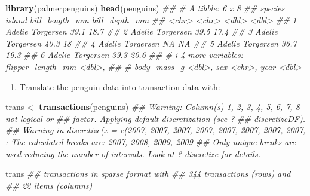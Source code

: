 \documentclass[
  notitlepage]{book}
\newenvironment{Shaded}{\begin{snugshade}}{\end{snugshade}}
\newcommand{\CommentTok}[1]{\textcolor[rgb]{0.56,0.35,0.01}{\textit{#1}}}
\newcommand{\KeywordTok}[1]{\textcolor[rgb]{0.13,0.29,0.53}{\textbf{#1}}}
\newcommand{\NormalTok}[1]{#1}
\newcommand{\StringTok}[1]{\textcolor[rgb]{0.31,0.60,0.02}{#1}}
\providecommand{\tightlist}{%
  \setlength{\itemsep}{0pt}\setlength{\parskip}{0pt}}
\begin{document}
\begin{Shaded}
\begin{Highlighting}[]
\KeywordTok{library}\NormalTok{(palmerpenguins)}
\KeywordTok{head}\NormalTok{(penguins)}
\CommentTok{\#\# \# A tibble: 6 x 8}
\CommentTok{\#\#   species island    bill\_length\_mm bill\_depth\_mm}
\CommentTok{\#\#   \textless{}chr\textgreater{}   \textless{}chr\textgreater{}              \textless{}dbl\textgreater{}         \textless{}dbl\textgreater{}}
\CommentTok{\#\# 1 Adelie  Torgersen           39.1          18.7}
\CommentTok{\#\# 2 Adelie  Torgersen           39.5          17.4}
\CommentTok{\#\# 3 Adelie  Torgersen           40.3          18  }
\CommentTok{\#\# 4 Adelie  Torgersen           NA            NA  }
\CommentTok{\#\# 5 Adelie  Torgersen           36.7          19.3}
\CommentTok{\#\# 6 Adelie  Torgersen           39.3          20.6}
\CommentTok{\#\# \# i 4 more variables: flipper\_length\_mm \textless{}dbl\textgreater{},}
\CommentTok{\#\# \#   body\_mass\_g \textless{}dbl\textgreater{}, sex \textless{}chr\textgreater{}, year \textless{}dbl\textgreater{}}
\end{Highlighting}
\end{Shaded}

\begin{enumerate}
\def\labelenumi{\arabic{enumi}.}
\tightlist
\item
  Translate the penguin data into transaction data with:
\end{enumerate}

\begin{Shaded}
\begin{Highlighting}[]
\NormalTok{trans \textless{}{-}}\StringTok{ }\KeywordTok{transactions}\NormalTok{(penguins)}
\CommentTok{\#\# Warning: Column(s) 1, 2, 3, 4, 5, 6, 7, 8 not logical or}
\CommentTok{\#\# factor. Applying default discretization (see \textquotesingle{}?}
\CommentTok{\#\# discretizeDF\textquotesingle{}).}
\CommentTok{\#\# Warning in discretize(x = c(2007, 2007, 2007, 2007, 2007, 2007, 2007, 2007, : The calculated breaks are: 2007, 2008, 2009, 2009}
\CommentTok{\#\#   Only unique breaks are used reducing the number of intervals. Look at ? discretize for details.}
\end{Highlighting}
\end{Shaded}

\begin{Shaded}
\begin{Highlighting}[]
\NormalTok{trans}
\CommentTok{\#\# transactions in sparse format with}
\CommentTok{\#\#  344 transactions (rows) and}
\CommentTok{\#\#  22 items (columns)}
\end{Highlighting}
\end{Shaded}
\end{document}
